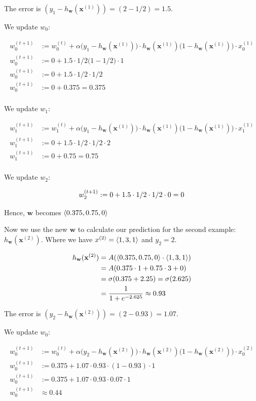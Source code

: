 The error is $(y_1 - h_{\mathbf{w}}(\mathbf{x}^{(1)})) = (2 - 1/2) = 1.5$.

We update $w_0$:

\begin{align*}
w_0^{(t+1)} &:= w_0^{(t)} + \alpha \big(y_1 - h_{\mathbf{w}}(\mathbf{x}^{(1)})\big) \cdot h_{\mathbf{w}}(\mathbf{x}^{(1)})\big(1 - h_{\mathbf{w}}(\mathbf{x}^{(1)})\big) \cdot x_0^{(1)} \\
w_0^{(t+1)} &:= 0 + 1.5 \cdot 1/2 \big(1 - 1/2 \big) \cdot 1 \\
w_0^{(t+1)} &:= 0 + 1.5 \cdot 1/2 \cdot  1/2 \\
w_0^{(t+1)} &:= 0 + 0.375 =  0.375\\
\end{align*}

We update $w_1$:

\begin{align*}
w_1^{(t+1)} &:= w_1^{(t)} + \alpha \big(y_1 - h_{\mathbf{w}}(\mathbf{x}^{(1)})\big) \cdot h_{\mathbf{w}}(\mathbf{x}^{(1)})\big(1 - h_{\mathbf{w}}(\mathbf{x}^{(1)})\big) \cdot x_1^{(1)} \\
w_1^{(t+1)} &:= 0 + 1.5 \cdot 1/2 \cdot 1/2 \cdot 2 \\
w_1^{(t+1)} &:= 0 + 0.75 = 0.75 \\
\end{align*}

We update $w_2$:

\[
w_2^{(t+1)} := 0 + 1.5 \cdot 1/2 \cdot 1/2 \cdot 0 = 0 \\
\]


Hence, $\mathbf{w}$ becomes $\left\langle 0.375,0.75,0 \right\rangle$

Now we use the new $\mathbf{w}$ to calculate our prediction for the second example: $h_{\mathbf{w}}(\mathbf{x}^{(2)})$. Where we have $x^{(2)} = \left\langle 1, 3, 1 \right\rangle$ and $y_2 = 2$.

\begin{align*}
h_{\mathbf{w}}(\mathbf{x}^{(2)}) &= A(\left\langle 0.375,0.75,0 \right\rangle \cdot \left\langle 1, 3, 1 \right\rangle) \\
&= A(0.375 \cdot 1 + 0.75 \cdot 3 + 0) \\
&= \sigma(0.375 + 2.25) = \sigma(2.625) \\ 
&= \frac{1}{1 + e^{-2.625}} \approx 0.93
\end{align*}

The error is $(y_2 - h_{\mathbf{w}}(\mathbf{x}^{(2)})) = (2 - 0.93) = 1.07$.

We update $w_0$:

\begin{align*}
w_0^{(t+1)} &:= w_0^{(t)} + \alpha \big(y_2 - h_{\mathbf{w}}(\mathbf{x}^{(2)})\big) \cdot h_{\mathbf{w}}(\mathbf{x}^{(2)})\big(1 - h_{\mathbf{w}}(\mathbf{x}^{(2)})\big) \cdot x_0^{(2)} \\
w_0^{(t+1)} &:= 0.375 +  1.07 \cdot 0.93 \cdot (1 - 0.93) \cdot 1 \\
w_0^{(t+1)} &:= 0.375 +  1.07 \cdot 0.93 \cdot 0.07 \cdot 1 \\
w_0^{(t+1)} &\approx 0.44 \\
\end{align*}

